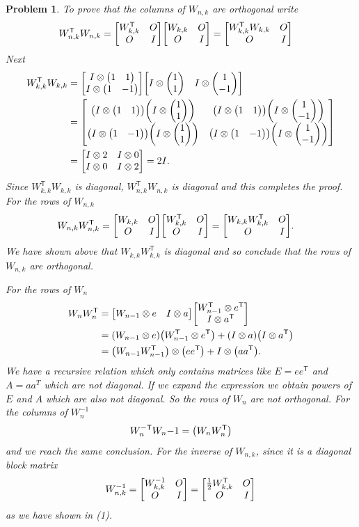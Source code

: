 \documentclass{article}
\newcommand{\T}{\mathsf{T}}
\theoremstyle{pprop}
\newtheorem{problem}{Problem}[section]
\begin{document}
\begin{problem}
To prove that the columns of $W_{n,k}$ are orthogonal write 
\begin{align*}
  W_{n,k}^\T W_{n,k} & = \mqty[W_{k,k}^\T & O \\ O & I] \mqty[W_{k,k} & O \\ O & I]
  = \mqty[W_{k,k}^\T W_{k,k} & O \\ O & I ]
\end{align*}
Next 
\begin{align*}
  W_{k,k}^\T W_{k,k} & = \mqty[I \otimes \mqty(1 & 1) \\ I \otimes \mqty(1 & -1) ]
  \mqty[I \otimes \mqty(1 \\ 1) & I \otimes \mqty(1 \\ -1)] \\
  & =\mqty[
    \qty(I \otimes \mqty(1 & 1))\qty(I \otimes \mqty(1 \\ 1))  & \qty(I \otimes \mqty(1 & 1))\qty(I \otimes \mqty(1 \\ -1)) \\
    \qty(I \otimes \mqty(1 & -1))\qty(I \otimes \mqty(1 \\ 1))  & \qty(I \otimes \mqty(1 & -1))\qty(I \otimes \mqty(1 \\ -1)) \\
  ] \\
  & = \mqty[
    I \otimes 2 & I \otimes 0 \\ I \otimes 0 & I \otimes 2
  ] = 2 I.
\end{align*}
Since $W_{k,k}^\T W_{k,k}$ is diagonal, $W_{n,k}^\T W_{n,k} $ is diagonal and this completes the proof. For the rows of $W_{n,k}$
\begin{align*}
  W_{n,k} W_{n,k}^\T & =\mqty[W_{k,k} & O \\ O & I] \mqty[W_{k,k}^\T & O \\ O & I] 
  = \mqty[W_{k,k} W_{k,k}^\T & O \\ O & I ].
\end{align*}
We have shown above that $W_{k,k} W_{k,k}^\T$ is diagonal and so conclude that the rows of $W_{n,k}$ are orthogonal.

For the rows of $W_n$
\begin{align*}
  W_n W_n^\T & = \mqty[ W_{n-1} \otimes e & I \otimes a]  \mqty[ W_{n-1}^\T \otimes e^\T \\ I \otimes a^\T] \\
  & = \qty(W_{n-1} \otimes e)\qty(W_{n-1}^\T \otimes e^\T ) + \qty(I \otimes a)\qty(I \otimes a^\T) \\
  & = \qty(W_{n-1}  W_{n-1}^\T)\otimes\qty(e e^\T) + I \otimes \qty(a a^\T).
\end{align*}
We have a recursive relation which only contains matrices like $E=e e^\T$ and $A=a a^T$ which are not diagonal. If we expand the expression 
we obtain powers of $E$ and $A$ which are also not diagonal. So the rows of $W_n$ are not orthogonal. For the columns of $W_n^{-1}$
\[
W_n^{-\T}W_n{-1}=\qty(W_n W_n^\T)
\]
and we reach the same conclusion. For the inverse of $W_{n,k}$, since it is a diagonal block matrix 
\[
W_{n,k}^{-1}=\mqty[W_{k,k}^{-1} & O \\ O & I]=\mqty[\frac12 W_{k,k}^\T & O \\ O & I]
\]
as we have shown in (1).
\end{problem}
\end{document}
